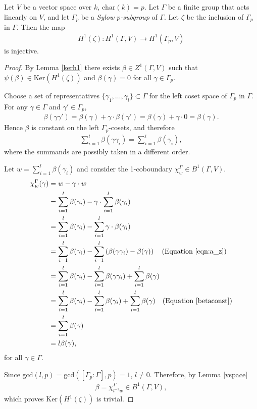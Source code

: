 \begin{lemma} \label{brown}
Let $V$ be a vector space over $k$, $\mathrm{char}(k) = p$. Let $\Gamma$ be a finite group that acts linearly on $V$, and let $\Gamma_p$ be a \emph{Sylow $p$-subgroup} of $\Gamma$. Let $\zeta$ be the inclusion of $\Gamma_p$ in $\Gamma$. Then the map 
\begin{align*}
H^1(\zeta):H^1(\Gamma, V)\rightarrow H^1(\Gamma_p, V)
\end{align*}
is injective.
\end{lemma}
\begin{proof}
	By Lemma \ref{kerh1} there exists $\beta \in Z^1(\Gamma, V)$ such that $\psi(\beta) \in \mathrm{Ker}\left(H^1(\zeta)\right)$ and $\beta(\gamma) = 0$ for all $\gamma \in \Gamma_p$.
	
	Choose a set of representatives $\{\gamma_1, \ldots, \gamma_l\} \subset \Gamma$ for the left coset space of $\Gamma_p$ in $\Gamma$.
	For any $\gamma \in \Gamma$ and $\gamma' \in \Gamma_p$,
\begin{align*}
	\beta(\gamma \gamma') = \beta(\gamma) + \gamma \cdot \beta(\gamma') = \beta(\gamma) +\gamma \cdot 0 = \beta(\gamma).
\end{align*} 
Hence $\beta$ is constant on the left $\Gamma_p$-cosets, and therefore
\begin{align}\label{betaconst}
	\sum_{i = 1}^l \beta(\gamma\gamma_i) = \sum_{i = 1}^l \beta(\gamma_i),
\end{align}
where the summands are possibly taken in a different order. 

Let $w = \sum_{i=1}^l \beta(\gamma_i)$ and consider the 1-coboundary $\chi^\Gamma_w \in B^1(\Gamma, V)$.
\begin{align*}
	\chi_{w}^\Gamma(\gamma) &=  w - \gamma\cdot w \\
	&=  \sum_{i = 1}^l\beta(\gamma_i) - \gamma\cdot \sum_{i = 1}^l\beta(\gamma_i) \\
	&=  \sum_{i = 1}^l\beta(\gamma_i) - \sum_{i = 1}^l\gamma \cdot \beta(\gamma_i) \\
	&=  \sum_{i = 1}^l\beta(\gamma_i) - \sum_{i = 1}^l\left(\beta(\gamma\gamma_i) - \beta(\gamma)\right) \quad(\textrm{Equation }\ref{eqn:a_z})\\
	&=  \sum_{i = 1}^l\beta(\gamma_i) - \sum_{i = 1}^l \beta(\gamma\gamma_i) +\sum_{i = 1}^l \beta(\gamma) \\
	&=  \sum_{i = 1}^l\beta(\gamma_i) - \sum_{i = 1}^l \beta(\gamma_i) +\sum_{i = 1}^l \beta(\gamma) \quad(\textrm{Equation }\ref{betaconst})\\
	&=  \sum_{i = 1}^l \beta(\gamma) \\
	&= l\beta(\gamma),
\end{align*}
for all $\gamma \in \Gamma$.

Since $\mathrm{gcd}(l, p) = \mathrm{gcd}\left([\Gamma_p:\Gamma], p\right) = 1$, $l \neq 0$. Therefore, by Lemma \ref{vspace}
\begin{align*}
	\beta = \chi^\Gamma_{l^{-1}w} \in B^1(\Gamma, V),
\end{align*}
which proves $\mathrm{Ker}\left(H^1(\zeta)\right)$ is trivial.
\end{proof}

